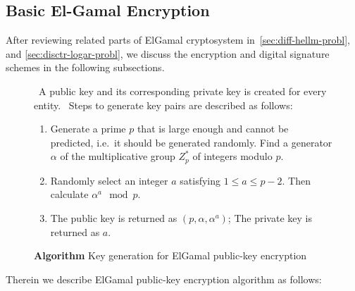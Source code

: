 \documentclass[12pt,journal,compsoc]{IEEEtran}
\begin{document}
\subsection{Basic El-Gamal Encryption}
After reviewing related parts of ElGamal cryptosystem
in~\autoref{sec:diff-hellm-probl}, and
\autoref{sec:disctr-logar-probl}, we discuss the encryption and
digital signature schemes in the following subsections.
\par
\begin{figure}[!htbp]
  \centering
  \begin{algorithmic}
    \ENSURE~A public key and its corresponding private key is created
    for every entity.
    \STATE~Steps to generate key pairs are described as follows:
    \begin{enumerate}
    \item Generate a prime $p$ that is large enough and cannot be
      predicted, i.e.\ it should be generated randomly. Find a
      generator $\alpha$ of the multiplicative group $Z_{p}^{*}$ of
      integers modulo $p$.
    \item Randomly select an integer $a$ satisfying $1\leq
      a\leq p-2$. Then calculate $\alpha^{a}\mod p$.
    \item The public key is returned as $(p,\alpha,\alpha^{a})$; The
      private key is returned as $a$.
    \end{enumerate}
  \end{algorithmic}
  \caption{\textbf{Algorithm} Key generation for ElGamal public-key encryption}
  \label{fig:basic-elgamal-encryption}
\end{figure}
\par
Therein we describe ElGamal public-key encryption algorithm as
follows:
\end{document}
